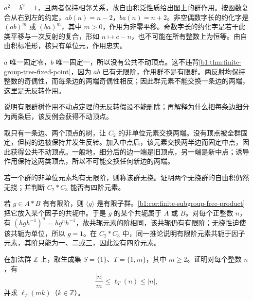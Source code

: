 \begin{solution}
	\(a^2=b^2=1\)，且两者保持相邻关系，故自由积泛性质给出图上的群作用。按函数复合从右到左的约定，\(ab(n)=n-2\)，\(ba(n)=n+2\)。非空偶数字长的约化字是 \((ab)^m\) 或 \((ba)^m\)，其中 \(m>0\)，作用为非零平移。奇数字长的约化字是若干此类平移与一次反射的复合，形如 \(n\mapsto c-n\)，也不可能在所有整数上为恒等。由自由积标准形，核只有单位元，作用忠实。

	\(a\) 唯一固定零，\(b\) 唯一固定一，所以没有公共不动顶点。这不违背\cref{b1:thm:finite-group-tree-fixed-point}，因为 \(ab\) 已有无限阶，作用群不是有限群。两反射均保持整数的奇偶性，而每条边的两端奇偶性相反；因此群元素不能交换一条边的两端，这里是无反转作用。
\end{solution}

\begin{exercise}\label{b1:ex:C-tree-inversion}
	说明有限群树作用不动点定理的无反转假设不能删除；再解释为什么把每条边细分为两条后，该反例会获得不动顶点。
\end{exercise}

\begin{solution}
	取只有一条边、两个顶点的树，让 \(C_2\) 的非单位元素交换两端。没有顶点被全群固定，但树的边被保持并发生反转。加入中点后，该元素交换两半边而固定中点，因此获得公共不动顶点。一般地，细分后的边一端是旧顶点，另一端是新中点；诱导作用保持这两类顶点，所以不可能交换任何新边的两端。
\end{solution}

\begin{exercise}\label{b1:ex:C-torsion-free-product}
	若一个群的非单位元素均有无限阶，则称该群无挠。证明两个无挠群的自由积仍然无挠；并判断 \(C_2*C_3\) 能否有四阶元素。
\end{exercise}

\begin{solution}
	若 \(g\in A*B\) 有有限阶，则 \(\langle g\rangle\) 是有限子群。\cref{b1:cor:finite-subgroup-free-product}把它放入某个因子的共轭中。于是 \(g\) 的某个共轭属于 \(A\) 或 \(B\)。对每个正整数 \(n\)，有 \((hgh^{-1})^n=hg^nh^{-1}\)，故共轭元素的阶相同，该共轭仍有有限阶；无挠性迫使该共轭为单位，所以 \(g=1\)。在 \(C_2*C_3\) 中，同一推论说明有限阶元素共轭于因子元素，其阶只能为一、二或三，因此没有四阶元素。
\end{solution}

\begin{exercise}\label{b1:ex:C-word-metrics}
	在加法群 \(\mathbb Z\) 上，取生成集 \(S=\{1\}\)、\(T=\{1,m\}\)，其中 \(m\geq2\)。证明对每个整数 \(n\)，有
	\[
		\frac{|n|}{m}\leq\ell_T(n)\leq|n|,
	\]
	并求 \(\ell_T(mk)\)（\(k\in\mathbb Z\)）。
\end{exercise}

